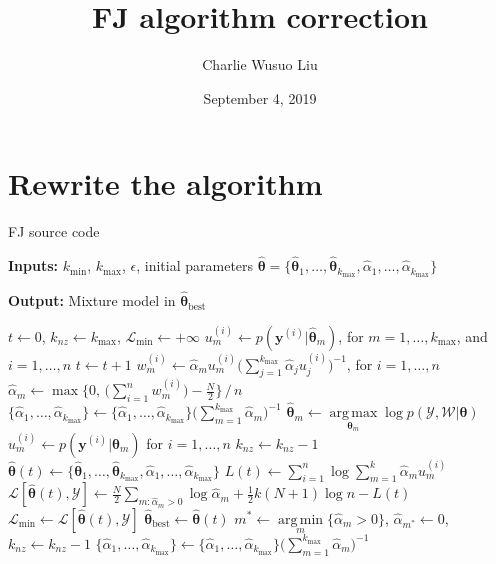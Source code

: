 \documentclass{article}
\DeclareMathOperator*{\argmax}{arg\,max}
\DeclareMathOperator*{\argmin}{arg\,min}
\begin{document}
	
	\title{FJ algorithm correction}
	\author{Charlie Wusuo Liu}
	\date{September 4, 2019}


\section{Rewrite the algorithm}

\begin{algorithm}
	\caption{FJ source code}\label{alg}
	 \textbf{Inputs:} $k_{\min}$, $k_{\max}$, $\epsilon$, initial parameters $\hat{\boldsymbol{\theta}}=\{\hat{\boldsymbol{\theta}}_1,\ldots,\hat{\boldsymbol{\theta}}_{k_{\max}},\hat{\alpha}_1,\ldots,\hat{\alpha}_{k_{\max}}\}$
	 
	\textbf{Output:} Mixture model in $\hat{\boldsymbol{\theta}}_{\text{best}}$

	
	\begin{algorithmic}[1]
		\STATE $t\gets0$, $k_{nz}\gets k_{\max}$, $\mathcal{L}_{\min}\gets+\infty$
     	\STATE $u_{m}^{(i)}\gets p(\boldsymbol{y}^{(i)}|\hat{\boldsymbol{\theta}}_{m})$, for $m=1,\ldots,k_{\max}$, and $i=1,\ldots,n$
     	  \REPEAT
     	  \STATE $t\gets t+1$
     	  \STATE $w^{(i)}_{m}\gets\hat{\alpha}_mu^{(i)}_m\big(\sum_{j=1}^{k_{\max}}\hat{\alpha}_ju^{(i)}_j\big)^{-1}$, for $i=1,\ldots,n$
     	  \STATE $\hat{\alpha}_m\gets\max\big\{0,\,\big(\sum_{i=1}^{n}w^{(i)}_m\big)-\frac{N}{2}\big\}\,/\,n$
     	  \STATE $\{\hat{\alpha}_1,\ldots,\hat{\alpha}_{k_{\max}}\}\gets\{\hat{\alpha}_1,\ldots,\hat{\alpha}_{k_{\max}}\}\big(\sum_{m=1}^{k_{\max}}\hat{\alpha}_m\big)^{-1}$
     	  \STATE $\hat{\boldsymbol{\theta}}_m\gets\underset{\boldsymbol{\theta}_m}{\argmax}\log p(\mathcal{Y,\mathcal{W}|\boldsymbol{\theta}})$
     	  \STATE $u^{(i)}_m\gets p(\boldsymbol{y}^{(i)}|\hat{\boldsymbol{\theta}}_m)$ for $i=1,\ldots,n$
     	  \ELSE
     	  \STATE $k_{nz}\gets k_{nz}-1$
     	  \ENDIF
     	  \ENDFOR
     	  \STATE $\hat{\boldsymbol{\theta}}(t)\gets\{\hat{\boldsymbol{\theta}}_1,\ldots,\hat{\boldsymbol{\theta}}_{k_{\max}},\hat{\alpha}_1,\ldots,\hat{\alpha}_{k_{\max}}\}$
     	  \STATE $L(t)\gets\sum_{i=1}^{n}\log\sum_{m=1}^{k}\hat{\alpha}_mu^{(i)}_m$
     	  \STATE $\mathcal{L}[\hat{\boldsymbol{\theta}}(t),\mathcal{Y}]\gets\frac{N}{2}\underset{m:\hat{\alpha}_m>0}{\sum}\log\hat{\alpha}_m+\frac{1}{2}k(N+1)\log n-L(t)$
     	 \STATE $\mathcal{L}_{\min}\gets\mathcal{L}[\hat{\boldsymbol{\theta}}(t),\mathcal{Y}]$
     	 \STATE $\hat{\boldsymbol{\theta}}_{\text{best}}\gets\hat{\boldsymbol{\theta}}(t)$
     	 \ENDIF
     	\STATE $m^*\gets\underset{m}{\argmin}\{\hat{\alpha}_m>0\}$, $\hat{\alpha}_{m^*}\gets0$, $k_{nz}\gets k_{nz}-1$
     	\STATE $\{\hat{\alpha}_1,\ldots,\hat{\alpha}_{k_{\max}}\}\gets\{\hat{\alpha}_1,\ldots,\hat{\alpha}_{k_{\max}}\}\big(\sum_{m=1}^{k_{\max}}\hat{\alpha}_m\big)^{-1}$
		\ENDWHILE
	\end{algorithmic}
\end{algorithm}
\end{document}
